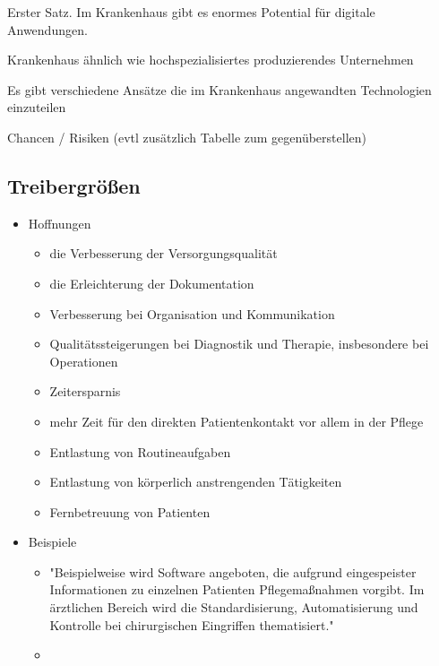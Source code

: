 Erster Satz. Im Krankenhaus gibt es enormes Potential für digitale Anwendungen. 

Krankenhaus ähnlich wie hochspezialisiertes produzierendes Unternehmen

Es gibt verschiedene Ansätze die im Krankenhaus angewandten Technologien einzuteilen

Chancen / Risiken (evtl zusätzlich Tabelle zum gegenüberstellen)
\subsection{Treibergrößen}
\begin{itemize}
	\item Hoffnungen \parencite[15]{braeutigam2017}
	\begin{itemize}
		\item die Verbesserung der Versorgungsqualität
		\item die Erleichterung der Dokumentation
		\item Verbesserung bei Organisation und Kommunikation
		\item Qualitätssteigerungen bei Diagnostik und Therapie, insbesondere bei Operationen
		\item Zeitersparnis
		\item mehr Zeit für den direkten Patientenkontakt vor allem in der Pflege
		\item Entlastung von Routineaufgaben
		\item Entlastung von körperlich anstrengenden Tätigkeiten
		\item Fernbetreuung von Patienten
	\end{itemize}
\end{itemize}
\begin{itemize}
	\item Beispiele
	\begin{itemize}
		\item "Beispielweise wird Software angeboten, die aufgrund eingespeister Informationen zu einzelnen Patienten Pflegemaßnahmen vorgibt. Im ärztlichen Bereich wird die Standardisierung, Automatisierung und Kontrolle bei chirurgischen Eingriffen thematisiert." \parencite[16]{braeutigam2017}
		\item 
	\end{itemize}
\end{itemize}
